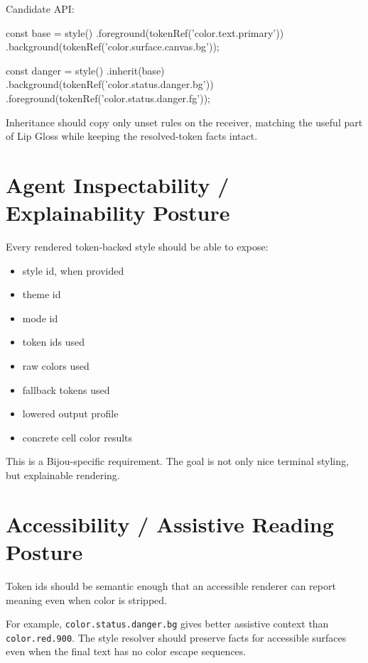 Candidate API:

\begin{CodeBlock}
const base = style()
  .foreground(tokenRef('color.text.primary'))
  .background(tokenRef('color.surface.canvas.bg'));

const danger = style()
  .inherit(base)
  .background(tokenRef('color.status.danger.bg'))
  .foreground(tokenRef('color.status.danger.fg'));
\end{CodeBlock}

Inheritance should copy only unset rules on the receiver, matching the useful part of Lip Gloss while keeping the resolved-token facts intact.

\section{Agent Inspectability / Explainability Posture}\label{record-178-agent-inspectability-explainability-posture}

Every rendered token-backed style should be able to expose:

\begin{itemize}
\tightlist
\item
  style id, when provided
\item
  theme id
\item
  mode id
\item
  token ids used
\item
  raw colors used
\item
  fallback tokens used
\item
  lowered output profile
\item
  concrete cell color results
\end{itemize}

This is a Bijou-specific requirement. The goal is not only nice terminal styling, but explainable rendering.

\section{Accessibility / Assistive Reading Posture}\label{record-178-accessibility-assistive-reading-posture}

Token ids should be semantic enough that an accessible renderer can report meaning even when color is stripped.

For example, \texttt{c\allowbreak{}o\allowbreak{}l\allowbreak{}o\allowbreak{}r\allowbreak{}.\allowbreak{}s\allowbreak{}t\allowbreak{}a\allowbreak{}t\allowbreak{}u\allowbreak{}s\allowbreak{}.\allowbreak{}d\allowbreak{}a\allowbreak{}n\allowbreak{}g\allowbreak{}e\allowbreak{}r\allowbreak{}.\allowbreak{}b\allowbreak{}g} gives better assistive context than \texttt{c\allowbreak{}o\allowbreak{}l\allowbreak{}o\allowbreak{}r\allowbreak{}.\allowbreak{}r\allowbreak{}e\allowbreak{}d\allowbreak{}.\allowbreak{}9\allowbreak{}0\allowbreak{}0}. The style resolver should preserve facts for accessible surfaces even when the final text has no color escape sequences.

